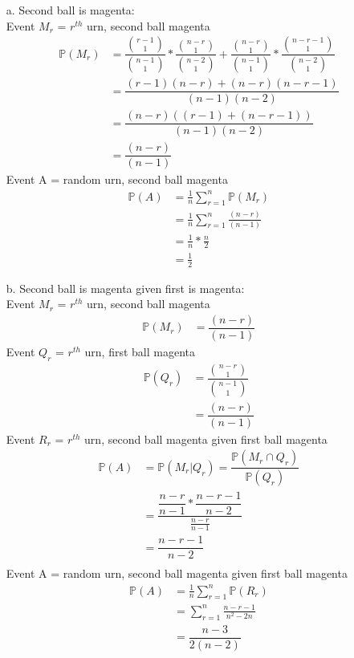 \documentclass{article}
\begin{document}
\begin{enumerate}
    \item[a.] Second ball is magenta: \\
        Event \(M_r\) = \(r^{th}\) urn, second ball magenta
        \begin{align*}
            \mathbb{P}(M_r) &= \dfrac{\binom{r-1}{1}}{\binom{n-1}{1}} * \dfrac{\binom{n-r}{1}}{\binom{n-2}{1}} + \dfrac{\binom{n-r}{1}}{\binom{n-1}{1}} * \dfrac{\binom{n-r-1}{1}}{\binom{n-2}{1}} \\
            &= \dfrac{(r-1)(n-r) + (n-r)(n-r-1)}{(n-1)(n-2)} \\
            &= \dfrac{(n-r)((r-1)+(n-r-1))}{(n-1)(n-2)} \\
            &= \dfrac{(n-r)}{(n-1)}
        \end{align*}
        Event A = random urn, second ball magenta
        \begin{align*}
            \mathbb{P}(A) &= \frac{1}{n}\sum\limits_{r=1}^{n}\mathbb{P}(M_r) \\
            &= \frac{1}{n}\sum\limits_{r=1}^{n}\frac{(n-r)}{(n-1)} \\
            &= \frac{1}{n} * \frac{n}{2} \\
            &= \frac{1}{2}
        \end{align*}
    \item[b.] Second ball is magenta given first is magenta: \\
        Event \(M_r\) = \(r^{th}\) urn, second ball magenta
        \begin{align*}
            \mathbb{P}(M_r) &= \dfrac{(n-r)}{(n-1)}
        \end{align*}
        Event \(Q_r\) = \(r^{th}\) urn, first ball magenta
        \begin{align*}
            \mathbb{P}(Q_r) &= \dfrac{\binom{n-r}{1}}{\binom{n-1}{1}} \\
            &= \dfrac{(n-r)}{(n-1)}
        \end{align*}
        Event \(R_r\) = \(r^{th}\) urn, second ball magenta given first ball magenta
        \begin{align*}
            \mathbb{P}(A) &= \mathbb{P}(M_r|Q_r) = \dfrac{\mathbb{P}(M_r \cap Q_r)}{\mathbb{P}(Q_r)} \\
            &= \dfrac{\dfrac{n-r}{n-1} * \dfrac{n-r-1}{n-2}}{\frac{n-r}{n-1}} \\
            &= \dfrac{n-r-1}{n-2} \\
        \end{align*}
        Event A = random urn, second ball magenta given first ball magenta
        \begin{align*}
            \mathbb{P}(A) &= \frac{1}{n}\sum\limits_{r=1}^{n}\mathbb{P}(R_r) \\
            &= \sum\limits_{r=1}^{n}\frac{n-r-1}{n^2-2n} \\
            &= \dfrac{n-3}{2(n-2)}
        \end{align*}
\end{enumerate}
\end{document}
